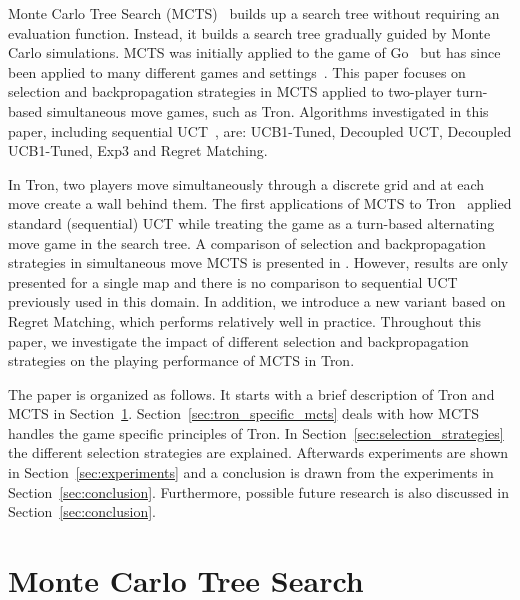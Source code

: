 \documentclass{article}
\begin{document}
Monte Carlo Tree Search (MCTS)~\cite{chaslot_phd,coulom,kocsis} builds up a search tree without requiring an evaluation function. Instead, it builds a search tree gradually guided by Monte Carlo simulations. MCTS was initially applied to the game of Go~\cite{coulom} but has since been applied to many different games and settings~\cite{mctssurvey}. This paper focuses on selection and backpropagation strategies in MCTS applied to two-player turn-based simultaneous move games, such as Tron. Algorithms investigated in this paper, including sequential UCT~\cite{kocsis}, are: UCB1-Tuned, Decoupled UCT, Decoupled UCB1-Tuned, Exp3 and Regret Matching.

In Tron, two players move simultaneously through a discrete grid and at each move create a wall behind them. 
The first applications of MCTS to Tron~\cite{teuling_tron,tron_cig} applied standard (sequential) UCT while treating the game as a turn-based alternating move game in the search tree. A comparison of selection and backpropagation strategies in simultaneous move MCTS is presented in \cite{cig_paper}. However, results are only presented for a single map and there is no comparison to sequential UCT previously used in this domain.
In addition, we introduce a new variant based on Regret Matching, which performs relatively well in practice. 
Throughout this paper, we investigate the impact of different selection and backpropagation strategies on the playing performance of MCTS in Tron.

The paper is organized as follows.
It starts with a brief description of Tron and MCTS in Section~\ref{sec:background}. 
Section~\ref{sec:tron_specific_mcts} deals with how MCTS handles the game specific principles of Tron. In Section~\ref{sec:selection_strategies} the different selection strategies are explained. Afterwards experiments are shown in Section~\ref{sec:experiments} and a conclusion is drawn from the experiments in Section~\ref{sec:conclusion}. Furthermore, possible future research is also discussed in Section~\ref{sec:conclusion}.

\section{Monte Carlo Tree Search}
\label{sec:background}
\end{document}
